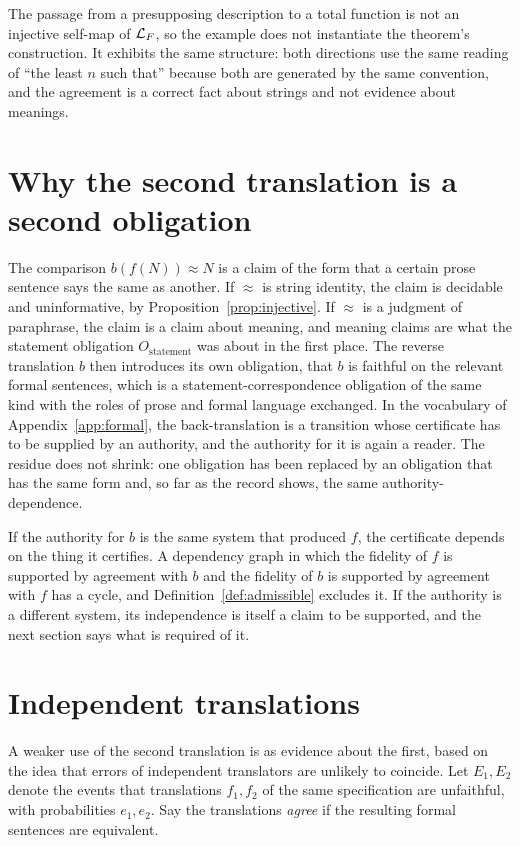 The passage from a presupposing description to a total function is not an injective self-map of $\mathcal{L}_F$, so the example does not instantiate the theorem's construction. It exhibits the same structure: both directions use the same reading of ``the least $n$ such that'' because both are generated by the same convention, and the agreement is a correct fact about strings and not evidence about meanings.

\section{Why the second translation is a second obligation}

The comparison $b(f(N)) \approx N$ is a claim of the form that a certain prose sentence says the same as another. If $\approx$ is string identity, the claim is decidable and uninformative, by Proposition~\ref{prop:injective}. If $\approx$ is a judgment of paraphrase, the claim is a claim about meaning, and meaning claims are what the statement obligation $O_{\mathrm{statement}}$ was about in the first place. The reverse translation $b$ then introduces its own obligation, that $b$ is faithful on the relevant formal sentences, which is a statement-correspondence obligation of the same kind with the roles of prose and formal language exchanged. In the vocabulary of Appendix~\ref{app:formal}, the back-translation is a transition whose certificate has to be supplied by an authority, and the authority for it is again a reader. The residue does not shrink: one obligation has been replaced by an obligation that has the same form and, so far as the record shows, the same authority-dependence.

If the authority for $b$ is the same system that produced $f$, the certificate depends on the thing it certifies. A dependency graph in which the fidelity of $f$ is supported by agreement with $b$ and the fidelity of $b$ is supported by agreement with $f$ has a cycle, and Definition~\ref{def:admissible} excludes it. If the authority is a different system, its independence is itself a claim to be supported, and the next section says what is required of it.

\section{Independent translations}

A weaker use of the second translation is as evidence about the first, based on the idea that errors of independent translators are unlikely to coincide. Let $E_1, E_2$ denote the events that translations $f_1, f_2$ of the same specification are unfaithful, with probabilities $e_1,e_2$. Say the translations \emph{agree} if the resulting formal sentences are equivalent.

